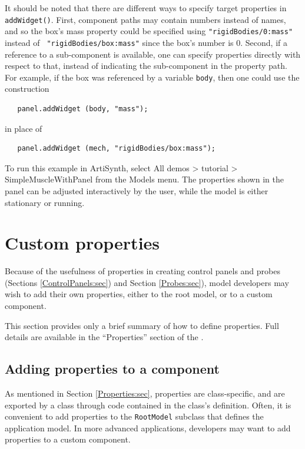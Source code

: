 \begin{sideblock}
It should be noted that there are different ways to specify target
properties in {\tt addWidget()}. First, component paths may contain
numbers instead of names, and so the box's mass property could be
specified using {\tt "rigidBodies/0:mass"} instead of {\tt
"rigidBodies/box:mass"} since the box's number is 0. Second, if a
reference to a sub-component is available, one can specify properties
directly with respect to that, instead of indicating the sub-component
in the property path. For example, if the box was referenced by a
variable {\tt body}, then one could use the construction
%
\begin{verbatim}
   panel.addWidget (body, "mass");
\end{verbatim}
%
in place of 
%
\begin{verbatim}
   panel.addWidget (mech, "rigidBodies/box:mass");
\end{verbatim}
%
\end{sideblock}

To run this example in ArtiSynth, select {\sf All demos > tutorial >
SimpleMuscleWithPanel} from the {\sf Models} menu. The properties 
shown in the panel can be adjusted interactively by the user,
while the model is either stationary or running.

\section{Custom properties}
\label{CustomProperties:sec}

Because of the usefulness of properties in creating control panels and
probes (Sections \ref{ControlPanels:sec}) and Section
\ref{Probes:sec}), model developers may wish to add their own
properties, either to the root model, or to a custom component.

This section provides only a brief summary of how to define
properties. Full details are available in the ``Properties'' section of
the .

\subsection{Adding properties to a component}

As mentioned in Section \ref{Properties:sec}, properties are
class-specific, and are exported by a class through code contained in
the class's definition.  Often, it is convenient to add properties to
the {\tt RootModel} subclass that defines the application model. In
more advanced applications, developers may want to add properties to a
custom component.

